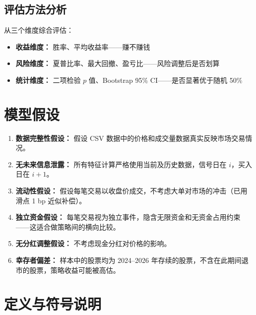 \documentclass[12pt,a4paper]{ctexart}
\numberwithin{figure}{section}
\numberwithin{table}{section}
\begin{document}
\subsection{评估方法分析}
从三个维度综合评估：
\begin{itemize}[leftmargin=*]
    \item {\bfseries 收益维度：} 胜率、平均收益率——赚不赚钱
    \item {\bfseries 风险维度：} 夏普比率、最大回撤、盈亏比——风险调整后是否划算
    \item {\bfseries 统计维度：} 二项检验 $p$ 值、Bootstrap 95\% CI——是否显著优于随机 50\%
\end{itemize}

\section{模型假设}

\begin{enumerate}[leftmargin=*]
    \item {\bfseries 数据完整性假设：} 假设 CSV 数据中的价格和成交量数据真实反映市场交易情况。
    \item {\bfseries 无未来信息泄露：} 所有特征计算严格使用当前及历史数据，信号日在 $i$，买入日在 $i+1$。
    \item {\bfseries 流动性假设：} 假设每笔交易以收盘价成交，不考虑大单对市场的冲击（已用滑点 1 bp 近似补偿）。
    \item {\bfseries 独立资金假设：} 每笔交易视为独立事件，隐含无限资金和无资金占用约束——这适合做策略间的横向比较。
    \item {\bfseries 无分红调整假设：} 不考虑现金分红对价格的影响。
    \item {\bfseries 幸存者偏差：} 样本中的股票均为 2024--2026 年存续的股票，不含在此期间退市的股票，策略收益可能被高估。
\end{enumerate}

\section{定义与符号说明}
\end{document}
